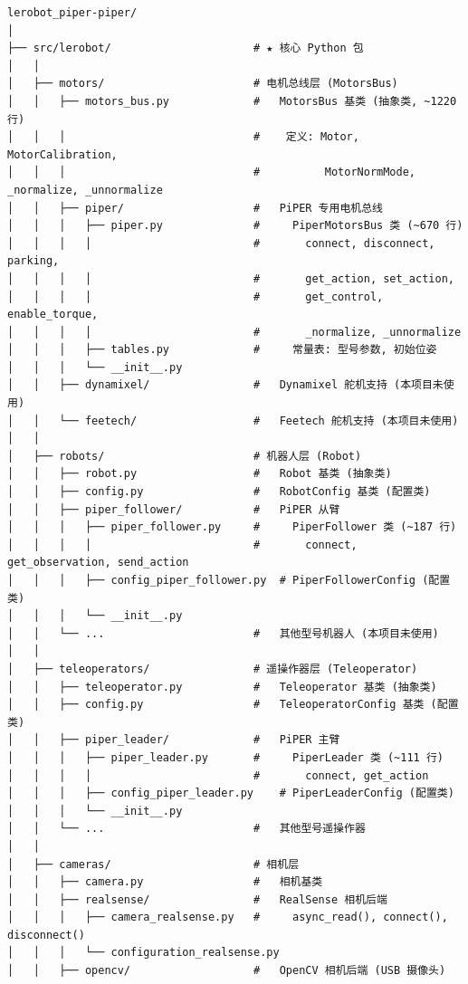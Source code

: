 \documentclass[UTF8,a4paper,11pt]{ctexart}
\begin{document}
\begin{lstlisting}[language=text]
lerobot_piper-piper/
│
├── src/lerobot/                      # ★ 核心 Python 包
│   │
│   ├── motors/                       # 电机总线层 (MotorsBus)
│   │   ├── motors_bus.py             #   MotorsBus 基类 (抽象类, ~1220 行)
│   │   │                             #    定义: Motor, MotorCalibration,
│   │   │                             #          MotorNormMode, _normalize, _unnormalize
│   │   ├── piper/                    #   PiPER 专用电机总线
│   │   │   ├── piper.py              #     PiperMotorsBus 类 (~670 行)
│   │   │   │                         #       connect, disconnect, parking,
│   │   │   │                         #       get_action, set_action,
│   │   │   │                         #       get_control, enable_torque,
│   │   │   │                         #       _normalize, _unnormalize
│   │   │   ├── tables.py             #     常量表: 型号参数, 初始位姿
│   │   │   └── __init__.py
│   │   ├── dynamixel/                #   Dynamixel 舵机支持 (本项目未使用)
│   │   └── feetech/                  #   Feetech 舵机支持 (本项目未使用)
│   │
│   ├── robots/                       # 机器人层 (Robot)
│   │   ├── robot.py                  #   Robot 基类 (抽象类)
│   │   ├── config.py                 #   RobotConfig 基类 (配置类)
│   │   ├── piper_follower/           #   PiPER 从臂
│   │   │   ├── piper_follower.py     #     PiperFollower 类 (~187 行)
│   │   │   │                         #       connect, get_observation, send_action
│   │   │   ├── config_piper_follower.py  # PiperFollowerConfig (配置类)
│   │   │   └── __init__.py
│   │   └── ...                       #   其他型号机器人 (本项目未使用)
│   │
│   ├── teleoperators/                # 遥操作器层 (Teleoperator)
│   │   ├── teleoperator.py           #   Teleoperator 基类 (抽象类)
│   │   ├── config.py                 #   TeleoperatorConfig 基类 (配置类)
│   │   ├── piper_leader/             #   PiPER 主臂
│   │   │   ├── piper_leader.py       #     PiperLeader 类 (~111 行)
│   │   │   │                         #       connect, get_action
│   │   │   ├── config_piper_leader.py    # PiperLeaderConfig (配置类)
│   │   │   └── __init__.py
│   │   └── ...                       #   其他型号遥操作器
│   │
│   ├── cameras/                      # 相机层
│   │   ├── camera.py                 #   相机基类
│   │   ├── realsense/                #   RealSense 相机后端
│   │   │   ├── camera_realsense.py   #     async_read(), connect(), disconnect()
│   │   │   └── configuration_realsense.py
│   │   ├── opencv/                   #   OpenCV 相机后端 (USB 摄像头)

\end{lstlisting}
\end{document}
